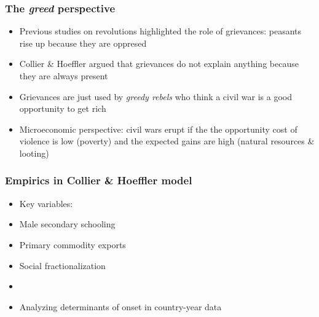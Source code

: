 \documentclass[utf8, xcolor=dvipsnames]{beamer}
\begin{document}
\begin{frame}
\frametitle{The \textit{greed} perspective}
\centering

\begin{itemize}[<+->]
  \item Previous studies on revolutions highlighted the role of grievances: peasants rise up because they are oppresed
  \item Collier \& Hoeffler argued that grievances do not explain anything because they are always present
  \item Grievances are just used by \textit{greedy rebels} who think a civil war is a good opportunity to get rich
  \item Microeconomic perspective: civil wars erupt if the the opportunity cost of violence is low (poverty) and the expected gains are high (natural resources \& looting)
\end{itemize}

\end{frame}

\begin{frame}
\frametitle{Empirics in Collier \& Hoeffler model}
\centering

\begin{itemize}
  \item[] Key variables:
  \item Male secondary schooling
  \item Primary commodity exports
  \item Social fractionalization
  \item[]
  \item Analyzing determinants of onset in country-year data
\end{itemize}

\end{frame}
\end{document}
